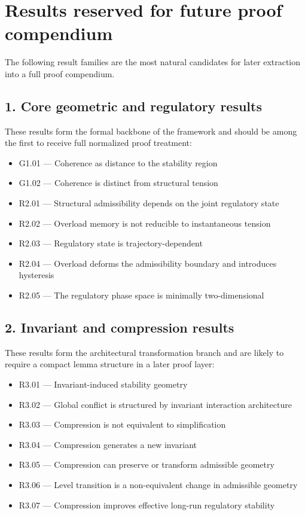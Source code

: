 \documentclass[12pt]{article}
\begin{document}
	\section{Results reserved for future proof compendium}
	
	The following result families are the most natural candidates for later extraction into a full
	proof compendium.
	
	\subsection*{1. Core geometric and regulatory results}
	
	These results form the formal backbone of the framework and should be among the first to receive
	full normalized proof treatment:
	
	\begin{itemize}[leftmargin=2em]
		\item G1.01 --- Coherence as distance to the stability region
		\item G1.02 --- Coherence is distinct from structural tension
		\item R2.01 --- Structural admissibility depends on the joint regulatory state
		\item R2.02 --- Overload memory is not reducible to instantaneous tension
		\item R2.03 --- Regulatory state is trajectory-dependent
		\item R2.04 --- Overload deforms the admissibility boundary and introduces hysteresis
		\item R2.05 --- The regulatory phase space is minimally two-dimensional
	\end{itemize}
	
	\subsection*{2. Invariant and compression results}
	
	These results form the architectural transformation branch and are likely to require a compact
	lemma structure in a later proof layer:
	
	\begin{itemize}[leftmargin=2em]
		\item R3.01 --- Invariant-induced stability geometry
		\item R3.02 --- Global conflict is structured by invariant interaction architecture
		\item R3.03 --- Compression is not equivalent to simplification
		\item R3.04 --- Compression generates a new invariant
		\item R3.05 --- Compression can preserve or transform admissible geometry
		\item R3.06 --- Level transition is a non-equivalent change in admissible geometry
		\item R3.07 --- Compression improves effective long-run regulatory stability
	\end{itemize}
	
\end{document}
